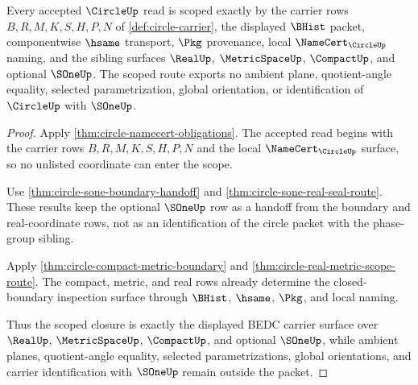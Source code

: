 \begin{theorem}
\label{thm:circle-real-metric-scoped-closure}
Every accepted $\CircleUp$ read is scoped exactly by the carrier rows $B,R,M,K,S,H,P,N$ of \autoref{def:circle-carrier}, the displayed $\BHist$ packet, componentwise $\hsame$ transport, $\Pkg$ provenance, local $\NameCert_{\CircleUp}$ naming, and the sibling surfaces $\RealUp$, $\MetricSpaceUp$, $\CompactUp$, and optional $\SOneUp$. The scoped route exports no ambient plane, quotient-angle equality, selected parametrization, global orientation, or identification of $\CircleUp$ with $\SOneUp$.
\end{theorem}
\begin{proof}
Apply \autoref{thm:circle-namecert-obligations}. The accepted read begins with the carrier rows $B,R,M,K,S,H,P,N$ and the local $\NameCert_{\CircleUp}$ surface, so no unlisted coordinate can enter the scope.

Use \autoref{thm:circle-sone-boundary-handoff} and \autoref{thm:circle-sone-real-seal-route}. These results keep the optional $\SOneUp$ row as a handoff from the boundary and real-coordinate rows, not as an identification of the circle packet with the phase-group sibling.

Apply \autoref{thm:circle-compact-metric-boundary} and \autoref{thm:circle-real-metric-scope-route}. The compact, metric, and real rows already determine the closed-boundary inspection surface through $\BHist$, $\hsame$, $\Pkg$, and local naming.

Thus the scoped closure is exactly the displayed BEDC carrier surface over $\RealUp$, $\MetricSpaceUp$, $\CompactUp$, and optional $\SOneUp$, while ambient planes, quotient-angle equality, selected parametrizations, global orientations, and carrier identification with $\SOneUp$ remain outside the packet.
\end{proof}

